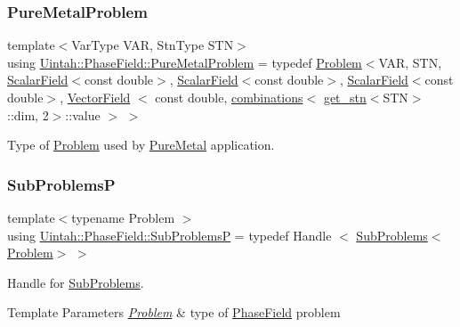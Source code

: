 \subsubsection{\texorpdfstring{Pure\+Metal\+Problem}{PureMetalProblem}}
{\footnotesize\ttfamily template$<$Var\+Type V\+AR, Stn\+Type S\+TN$>$ \\
using \hyperlink{namespaceUintah_1_1PhaseField_a8b672bdd087de9e7387512bfe7c7d3a4}{Uintah\+::\+Phase\+Field\+::\+Pure\+Metal\+Problem} = typedef \hyperlink{classUintah_1_1PhaseField_1_1Problem}{Problem}$<$V\+AR, S\+TN, \hyperlink{structUintah_1_1PhaseField_1_1ScalarField}{Scalar\+Field}$<$const double$>$, \hyperlink{structUintah_1_1PhaseField_1_1ScalarField}{Scalar\+Field}$<$const double$>$, \hyperlink{structUintah_1_1PhaseField_1_1ScalarField}{Scalar\+Field}$<$const double$>$, \hyperlink{structUintah_1_1PhaseField_1_1VectorField}{Vector\+Field} $<$ const double, \hyperlink{structUintah_1_1PhaseField_1_1combinations}{combinations}$<$ \hyperlink{structUintah_1_1PhaseField_1_1get__stn}{get\+\_\+stn}$<$S\+TN$>$\+::dim, 2$>$\+::value $>$ $>$}



Type of \hyperlink{classUintah_1_1PhaseField_1_1Problem}{Problem} used by \hyperlink{classUintah_1_1PhaseField_1_1PureMetal}{Pure\+Metal} application. 

\mbox{\label{namespaceUintah_1_1PhaseField_acb95bc634a12aa4120b33fbe933f24bd}} 
\subsubsection{\texorpdfstring{Sub\+ProblemsP}{SubProblemsP}}
{\footnotesize\ttfamily template$<$typename Problem $>$ \\
using \hyperlink{namespaceUintah_1_1PhaseField_acb95bc634a12aa4120b33fbe933f24bd}{Uintah\+::\+Phase\+Field\+::\+Sub\+ProblemsP} = typedef Handle $<$ \hyperlink{structUintah_1_1PhaseField_1_1SubProblems}{Sub\+Problems}$<$\hyperlink{classUintah_1_1PhaseField_1_1Problem}{Problem}$>$ $>$}



Handle for \hyperlink{structUintah_1_1PhaseField_1_1SubProblems}{Sub\+Problems}. 


\begin{DoxyTemplParams}{Template Parameters}
{\em \hyperlink{classUintah_1_1PhaseField_1_1Problem}{Problem}} & type of \hyperlink{namespaceUintah_1_1PhaseField}{Phase\+Field} problem \\
\hline
\end{DoxyTemplParams}
\mbox{\label{namespaceUintah_1_1PhaseField_a769cb9d270a04e03ff788b4d16ff6c2b}} 
